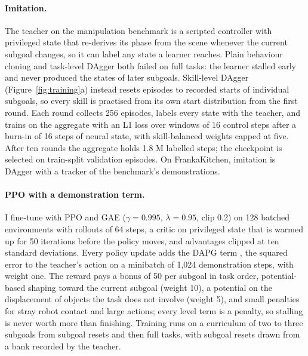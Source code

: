 \documentclass[10pt,twocolumn]{article}
\begin{document}
\paragraph{Imitation.}
The teacher on the manipulation benchmark is a scripted controller with privileged state that re-derives its phase from the scene whenever the current subgoal changes, so it can label any state a learner reaches.
Plain behaviour cloning and task-level DAgger \citep{ross2011dagger} both failed on full tasks: the learner stalled early and never produced the states of later subgoals.
Skill-level DAgger (Figure~\ref{fig:training}a) instead resets episodes to recorded starts of individual subgoals, so every skill is practised from its own start distribution from the first round.
Each round collects 256 episodes, labels every state with the teacher, and trains on the aggregate with an L1 loss over windows of 16 control steps after a burn-in of 16 steps of neural state, with skill-balanced weights capped at five.
After ten rounds the aggregate holds 1.8 M labelled steps; the checkpoint is selected on train-split validation episodes.
On FrankaKitchen, imitation is DAgger with a tracker of the benchmark's demonstrations.

\paragraph{PPO with a demonstration term.}
I fine-tune with PPO \citep{schulman2017ppo} and GAE \citep{schulman2016gae} ($\gamma = 0.995$, $\lambda = 0.95$, clip 0.2) on 128 batched environments with rollouts of 64 steps, a critic on privileged state that is warmed up for 50 iterations before the policy moves, and advantages clipped at ten standard deviations.
Every policy update adds the DAPG term \citep{rajeswaran2018dapg}, the squared error to the teacher's action on a minibatch of 1,024 demonstration steps, with weight one.
The reward pays a bonus of 50 per subgoal in task order, potential-based shaping toward the current subgoal (weight 10), a potential on the displacement of objects the task does not involve (weight 5), and small penalties for stray robot contact and large actions; every level term is a penalty, so stalling is never worth more than finishing.
Training runs on a curriculum of two to three subgoals from subgoal resets and then full tasks, with subgoal resets drawn from a bank recorded by the teacher.
\end{document}
